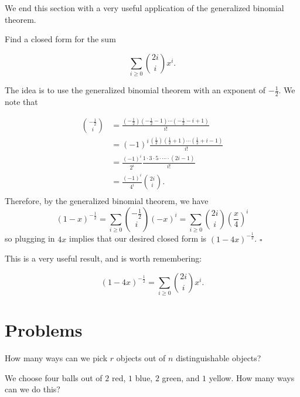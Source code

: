 \documentclass{article}
\begin{document}
We end this section with a very useful application of the generalized binomial theorem.

\begin{exam}
Find a closed form for the sum

\[\sum_{i \ge 0} \binom{2i}{i} x^i.\]
\end{exam}
\begin{sol}
The idea is to use the generalized binomial theorem with an exponent of $-\tfrac{1}{2}$. We note that

\begin{align*}
\binom{-\tfrac{1}{2}}{i} & = \frac{\left(-\tfrac{1}{2}\right)\left(-\tfrac{1}{2} - 1\right)\cdots\left(-\tfrac{1}{2}-i+1\right)}{i!}\\
& = (-1)^i\frac{\left(\tfrac{1}{2}\right)\left(\tfrac{1}{2} + 1\right)\cdots\left(\tfrac{1}{2}+i-1\right)}{i!}\\
& = \frac{(-1)^i}{2^i}\frac{1\cdot3\cdot5\cdot\cdots\cdot(2i-1)}{i!}\\
& = \frac{(-1)^i}{4^i}\binom{2i}{i}.\\
\end{align*}
Therefore, by the generalized binomial theorem, we have
\[(1-x)^{-\tfrac{1}{2}} = \sum_{i \ge 0} \binom{-\tfrac12}{i}(-x)^i = \sum_{i \ge 0}\binom{2i}{i}\left(\frac{x}{4}\right)^i\]
so plugging in $4x$ implies that our desired closed form is $(1-4x)^{-\tfrac12}$. $\square$
\end{sol}
\bigskip

This is a very useful result, and is worth remembering:

\begin{theo}
\[(1-4x)^{-\tfrac12} = \sum_{i \ge 0} \binom{2i}{i}x^i.\]
\end{theo}

\newpage

\section{Problems}


\begin{prob}{1}
How many ways can we pick $r$ objects out of $n$ distinguishable objects?
\end{prob}

\begin{prob}[]{2}
We choose four balls out of $2$ red, $1$ blue, $2$ green, and $1$ yellow. How many ways can we do this?
\end{prob}
\end{document}

